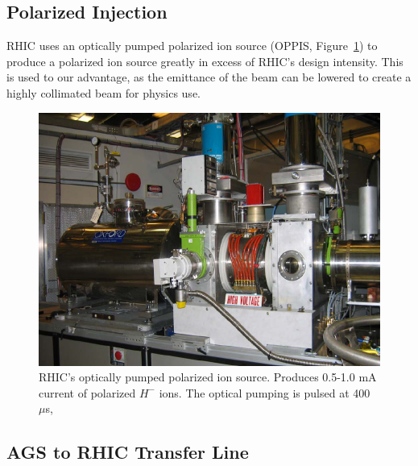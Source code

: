 \subsection{Polarized Injection}

RHIC uses an optically pumped polarized ion source (OPPIS,
Figure~\ref{fig:rhic_oppis}) to produce a polarized ion source greatly in excess
of RHIC's design intensity. This is used to our advantage, as the emittance of
the beam can be lowered to create a highly collimated beam for physics use.

\begin{figure}[ht]
	\centering
	\includegraphics[width=0.8\linewidth]{./figures/rhic_oppis.png}
	\caption{
		RHIC's optically pumped polarized ion source. Produces 0.5-1.0 mA current of
		polarized $H^-$ ions. The optical pumping is pulsed at 400
		$\mu$s, \cite{Zelenski2007}
	}
	\label{fig:rhic_oppis}
\end{figure}

\clearpage
\subsection{AGS to RHIC Transfer Line}


